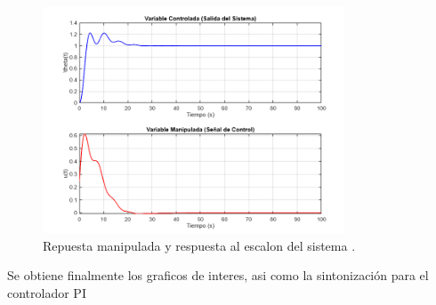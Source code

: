 \begin{itemize}
	\begin{figure}[H]
		\centering
		\includegraphics[width=0.8\textwidth]{img/[P3]Respuesta al escalon.png}
		\caption{Repuesta manipulada y respuesta al escalon del sistema .}
		\label{img:curvas-nivel}
	\end{figure}
	Se obtiene finalmente los graficos de interes, asi como la sintonización para el controlador PI

\end{itemize}
